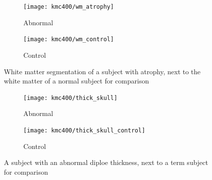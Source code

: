 \begin{figure}
	\centering
	\begin{subfigure}{0.45\textwidth}
		\texttt{[image: kmc400/wm\_atrophy]}
		\caption{Abnormal}
	\end{subfigure}\hfill
	\begin{subfigure}{0.45\textwidth}
		\texttt{[image: kmc400/wm\_control]}
		\caption{Control}
	\end{subfigure}
	\caption{White matter segmentation of a subject with atrophy, next to the white matter of a normal subject for comparison}
	\label{fig_white_matter}
\end{figure}

\begin{figure}
	\centering
	\begin{subfigure}{0.45\textwidth}
		\texttt{[image: kmc400/thick\_skull]}
		\caption{Abnormal}
	\end{subfigure}\hfill
	\begin{subfigure}{0.45\textwidth}
		\texttt{[image: kmc400/thick\_skull\_control]}
		\caption{Control}
	\end{subfigure}
	\caption{A subject with an abnormal diploe thickness, next to a term subject for comparison}
	\label{fig_diploe}
\end{figure}

